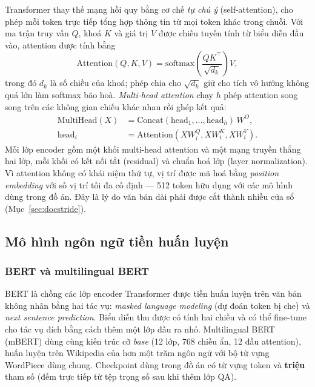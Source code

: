 Transformer \cite{vaswani2017attention} thay thế mạng hồi quy bằng cơ chế \emph{tự chú
ý} (self-attention), cho phép mỗi token trực tiếp tổng hợp thông tin từ mọi token khác
trong chuỗi. Với ma trận truy vấn $Q$, khoá $K$ và giá trị $V$ được chiếu tuyến tính từ
biểu diễn đầu vào, attention được tính bằng
\begin{equation}
  \mathrm{Attention}(Q, K, V) = \mathrm{softmax}\!\left( \frac{Q K^\top}{\sqrt{d_k}} \right) V,
\end{equation}
trong đó $d_k$ là số chiều của khoá; phép chia cho $\sqrt{d_k}$ giữ cho tích vô hướng
không quá lớn làm softmax bão hoà. \emph{Multi-head attention} chạy $h$ phép attention
song song trên các không gian chiếu khác nhau rồi ghép kết quả:
\begin{equation}
  \begin{aligned}
  \mathrm{MultiHead}(X) &= \mathrm{Concat}(\mathrm{head}_1, \dots, \mathrm{head}_h)\, W^O, \\
  \mathrm{head}_i &= \mathrm{Attention}(X W_i^Q, X W_i^K, X W_i^V).
  \end{aligned}
\end{equation}
Mỗi lớp encoder gồm một khối multi-head attention và một mạng truyền thẳng hai lớp, mỗi
khối có kết nối tắt (residual) và chuẩn hoá lớp (layer normalization). Vì attention
không có khái niệm thứ tự, vị trí được mã hoá bằng \emph{position embedding} với số vị
trí tối đa cố định --- 512 token hữu dụng với các mô hình dùng trong đồ án. Đây là lý do
văn bản dài phải được cắt thành nhiều cửa sổ (Mục~\ref{sec:docstride}).

\subsection{Mô hình ngôn ngữ tiền huấn luyện}
\label{sec:plm}

\subsubsection{BERT và multilingual BERT}

BERT \cite{devlin2019bert} là chồng các lớp encoder Transformer được tiền huấn luyện
trên văn bản không nhãn bằng hai tác vụ: \emph{masked language modeling} (dự đoán token
bị che) và \emph{next sentence prediction}. Biểu diễn thu được có tính hai chiều và có
thể fine-tune cho tác vụ đích bằng cách thêm một lớp đầu ra nhỏ. Multilingual BERT
(mBERT) dùng cùng kiến trúc cỡ \emph{base} (12 lớp, 768 chiều ẩn, 12 đầu attention),
huấn luyện trên Wikipedia của hơn một trăm ngôn ngữ với bộ từ vựng WordPiece
\cite{wu2016gnmt} dùng chung. Checkpoint  dùng trong
đồ án có từ vựng \textbf{\tokVocabMbert{}} token và \textbf{\tokParamsMbert{} triệu} tham số
(đếm trực tiếp từ tệp trọng số sau khi thêm lớp QA).

